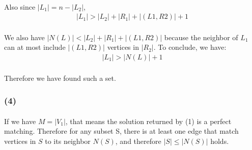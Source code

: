 \paragraph{}
Also since $|L_1| = n - |L_2|$,
\begin{align*}
|L_1| > |L_2| + |R_1| +|(L1, R2)|+1
\end{align*}
\paragraph{}
We also have $|N(L)| < |L_2| + |R_1| +|(L1, R2)|$ because the neighbor of $L_1$ can at most include $|(L1, R2)|$ vertices in $|R_2|$. To conclude, we have:
\begin{align*}
|L_1| > |N(L)| +1
\end{align*}
\paragraph{}
Therefore we have found such a set.
\subsubsection*{(4)}
\paragraph{}
If we have $M=|V_1|$, that means the solution returned by (1) is a perfect matching. Therefore for any subset S, there is at least one edge that match vertices in $S$ to its neighbor $N(S)$, and therefore $|S| \leq |N(S)|$ holds.